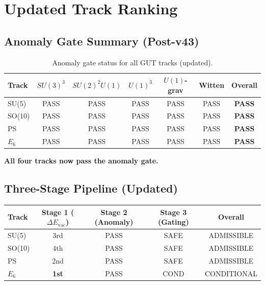 \documentclass[11pt,a4paper]{article}
\begin{document}
\section{Updated Track Ranking}
\label{sec:ranking}

\subsection{Anomaly Gate Summary (Post-v43)}

\begin{table}[h]
\centering
\caption{Anomaly gate status for all GUT tracks (updated).}
\label{tab:anomaly-gate-updated}
\begin{tabular}{lcccccc}
\toprule
Track & $SU(3)^3$ & $SU(2)^2 U(1)$ & $U(1)^3$ & $U(1)$-grav & Witten & \textbf{Overall} \\
\midrule
SU(5) & PASS & PASS & PASS & PASS & PASS & \textcolor{green!60!black}{\textbf{PASS}} \\
SO(10) & PASS & PASS & PASS & PASS & PASS & \textcolor{green!60!black}{\textbf{PASS}} \\
PS & PASS & PASS & PASS & PASS & PASS & \textcolor{green!60!black}{\textbf{PASS}} \\
$E_6$ & PASS & PASS & PASS & PASS & PASS & \textcolor{green!60!black}{\textbf{PASS}} \\
\bottomrule
\end{tabular}
\end{table}

\textbf{All four tracks now pass the anomaly gate.}

\subsection{Three-Stage Pipeline (Updated)}

\begin{center}
\begin{tabular}{lcccc}
\toprule
Track & Stage 1 ($\Delta E_{\text{vac}}$) & Stage 2 (Anomaly) & Stage 3 (Gating) & \textbf{Overall} \\
\midrule
SU(5) & 3rd & \textcolor{green!60!black}{PASS} & SAFE & ADMISSIBLE \\
SO(10) & 4th & \textcolor{green!60!black}{PASS} & SAFE & ADMISSIBLE \\
PS & 2nd & \textcolor{green!60!black}{PASS} & SAFE & ADMISSIBLE \\
$E_6$ & \textbf{1st} & \textcolor{green!60!black}{PASS} & COND & CONDITIONAL \\
\bottomrule
\end{tabular}
\end{center}
\end{document}

